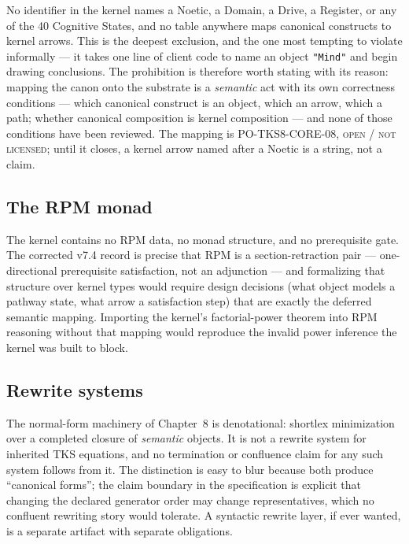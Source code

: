 No identifier in the kernel names a Noetic, a Domain, a Drive, a
Register, or any of the 40 Cognitive States, and no table anywhere maps
canonical constructs to kernel arrows. This is the deepest exclusion, and
the one most tempting to violate informally --- it takes one line of
client code to name an object \texttt{"Mind"} and begin drawing
conclusions. The prohibition is therefore worth stating with its reason:
mapping the canon onto the substrate is a \emph{semantic} act with its
own correctness conditions --- which canonical construct is an object,
which an arrow, which a path; whether canonical composition is kernel
composition --- and none of those conditions have been reviewed. The
mapping is PO-TKS8-CORE-08, \textsc{open / not licensed}; until it
closes, a kernel arrow named after a Noetic is a string, not a claim.

\subsection{The RPM monad}

The kernel contains no RPM data, no monad structure, and no prerequisite
gate. The corrected v7.4 record is precise that RPM is a
section-retraction pair --- one-directional prerequisite satisfaction,
not an adjunction --- and formalizing that structure over kernel types
would require design decisions (what object models a pathway state,
what arrow a satisfaction step) that are exactly the deferred semantic
mapping. Importing the kernel's factorial-power theorem into RPM
reasoning without that mapping would reproduce the invalid power
inference the kernel was built to block.

\subsection{Rewrite systems}

The normal-form machinery of Chapter~8 is denotational: shortlex
minimization over a completed closure of \emph{semantic} objects. It is
not a rewrite system for inherited TKS equations, and no termination or
confluence claim for any such system follows from it. The distinction is
easy to blur because both produce ``canonical forms''; the claim boundary
in the specification is explicit that changing the declared generator
order may change representatives, which no confluent rewriting story
would tolerate. A syntactic rewrite layer, if ever wanted, is a separate
artifact with separate obligations.

